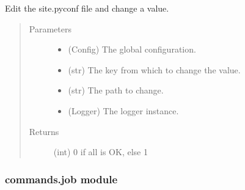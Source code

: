 \documentclass[a4paper,10pt,english]{sphinxmanual}
\begin{document}

\begin{fulllineitems}
\label{\detokenize{apidoc_commands/commands:commands.init.set_local_value}}
Edit the site.pyconf file and change a value.
\begin{quote}\begin{description}
\item[{Parameters}] \leavevmode\begin{itemize}
\item {} 
 \textendash{} (Config) The global configuration.

\item {} 
 \textendash{} (str) The key from which to change the value.

\item {} 
 \textendash{} (str) The path to change.

\item {} 
 \textendash{} (Logger) The logger instance.

\end{itemize}

\item[{Returns}] \leavevmode
(int) 0 if all is OK, else 1

\end{description}\end{quote}

\end{fulllineitems}



\subsubsection{commands.job module}
\label{\detokenize{apidoc_commands/commands:commands-job-module}}\label{\detokenize{apidoc_commands/commands:module-commands.job}}
\end{document}
